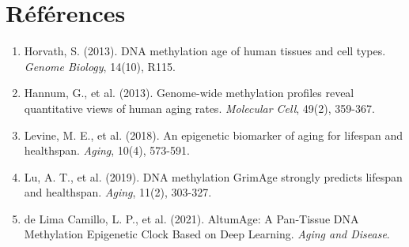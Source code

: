 \documentclass[11pt,a4paper]{article}
\begin{document}
\section*{Références}

\begin{enumerate}
    \item Horvath, S. (2013). DNA methylation age of human tissues and cell types. 
          \textit{Genome Biology}, 14(10), R115.
    
    \item Hannum, G., et al. (2013). Genome-wide methylation profiles reveal quantitative 
          views of human aging rates. \textit{Molecular Cell}, 49(2), 359-367.
    
    \item Levine, M. E., et al. (2018). An epigenetic biomarker of aging for lifespan 
          and healthspan. \textit{Aging}, 10(4), 573-591.
    
    \item Lu, A. T., et al. (2019). DNA methylation GrimAge strongly predicts lifespan 
          and healthspan. \textit{Aging}, 11(2), 303-327.
    
    \item de Lima Camillo, L. P., et al. (2021). AltumAge: A Pan-Tissue DNA Methylation 
          Epigenetic Clock Based on Deep Learning. \textit{Aging and Disease}.
\end{enumerate}
\end{document}
